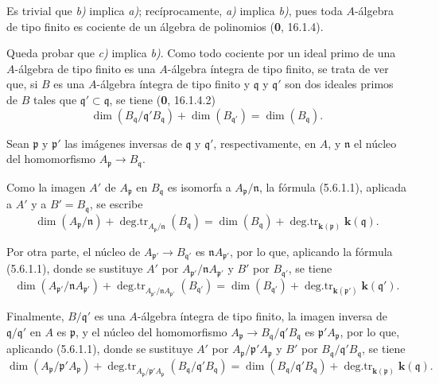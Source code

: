 Es trivial que \emph{b)} implica \emph{a)}; recíprocamente, \emph{a)} implica \emph{b)}, pues toda
$A$-álgebra de tipo finito es cociente de un álgebra de polinomios
(\textbf 0, 16.1.4).

Queda probar que \emph{c)} implica \emph{b)}. Como todo cociente por un ideal primo
de una $A$-álgebra de tipo finito es una $A$-álgebra íntegra de tipo finito, se trata
de ver que, si $B$ es una $A$-álgebra íntegra de tipo finito y $\mathfrak q$ y
$\mathfrak q'$ son dos ideales primos de $B$ tales que
$\mathfrak q'\subset\mathfrak q$, se tiene (\textbf 0, 16.1.4.2)
\begin{equation}
\dim(B_{\mathfrak q}/\mathfrak q'B_{\mathfrak q})
+\dim(B_{\mathfrak q'})=\dim(B_{\mathfrak q}).
\tag{5.6.1.2}\label{IV.2.s5.6.1.2-fr}
\end{equation}

Sean $\mathfrak p$ y $\mathfrak p'$ las imágenes inversas de $\mathfrak q$ y
$\mathfrak q'$, respectivamente, en $A$, y $\mathfrak n$ el núcleo del
homomorfismo $A_{\mathfrak p}\to B_{\mathfrak q}$.

Como la imagen $A'$ de $A_{\mathfrak p}$ en $B_{\mathfrak q}$ es isomorfa a
$A_{\mathfrak p}/\mathfrak n$, la fórmula (5.6.1.1), aplicada a $A'$ y a
$B'=B_{\mathfrak q}$, se escribe
\begin{equation}
\dim(A_{\mathfrak p}/\mathfrak n)
+\operatorname{deg.tr}_{A_{\mathfrak p}/\mathfrak n}(B_{\mathfrak q})
=\dim(B_{\mathfrak q})
+\operatorname{deg.tr}_{\mathbf{k}(\mathfrak p)}\boldsymbol{k}(\mathfrak q).
\tag{5.6.1.3}\label{IV.2.s5.6.1.3-fr}
\end{equation}

Por otra parte, el núcleo de $A_{\mathfrak p'}\to B_{\mathfrak q'}$ es
$\mathfrak nA_{\mathfrak p'}$, por lo que, aplicando la fórmula (5.6.1.1),
donde se sustituye $A'$ por
$A_{\mathfrak p'}/\mathfrak nA_{\mathfrak p'}$ y $B'$ por
$B_{\mathfrak q'}$, se tiene
\begin{equation}
\dim(A_{\mathfrak p'}/\mathfrak nA_{\mathfrak p'})
+\operatorname{deg.tr}_{A_{\mathfrak p'}/\mathfrak nA_{\mathfrak p'}}
(B_{\mathfrak q'})
=\dim(B_{\mathfrak q'})
+\operatorname{deg.tr}_{\mathbf{k}(\mathfrak p')}\boldsymbol{k}(\mathfrak q').
\tag{5.6.1.4}\label{IV.2.s5.6.1.4-fr}
\end{equation}

Finalmente, $B/\mathfrak q'$ es una $A$-álgebra íntegra de tipo finito, la
imagen inversa de $\mathfrak q/\mathfrak q'$ en $A$ es $\mathfrak p$, y el
núcleo del homomorfismo
$A_{\mathfrak p}\to B_{\mathfrak q}/\mathfrak q'B_{\mathfrak q}$ es
$\mathfrak p'A_{\mathfrak p}$, por lo que, aplicando (5.6.1.1), donde se
sustituye $A'$ por $A_{\mathfrak p}/\mathfrak p'A_{\mathfrak p}$ y $B'$ por
$B_{\mathfrak q}/\mathfrak q'B_{\mathfrak q}$, se tiene
\begin{equation}
\dim(A_{\mathfrak p}/\mathfrak p'A_{\mathfrak p})
+\operatorname{deg.tr}_{A_{\mathfrak p}/\mathfrak p'A_{\mathfrak p}}
(B_{\mathfrak q}/\mathfrak q'B_{\mathfrak q})
=\dim(B_{\mathfrak q}/\mathfrak q'B_{\mathfrak q})
+\operatorname{deg.tr}_{\mathbf{k}(\mathfrak p)}\boldsymbol{k}(\mathfrak q).
\tag{5.6.1.5}\label{IV.2.s5.6.1.5-fr}
\end{equation}

